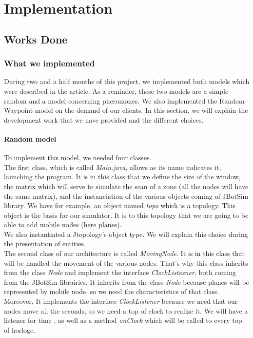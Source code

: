 \part{Implementation}

\setcounter{chapter}{0}

\chapter{Works Done}

\section{What we implemented}

During two and a half months of this project, we implemented both models which were described in the article. As a reminder, these two models are a simple random and a model concerning pheromones. We also implemented the Random Waypoint model on the demand of our clients. In this section, we will explain the development work that we have provided and the different choices.

\subsection{Random model} 

To implement this model, we needed four classes.\\
The first class, which is called \textit{Main.java}, allows as its name indicates it, launching the program. It is in this class that we define the size of the window, the matrix which will serve to simulate the scan of a zone (all the nodes will have the same matrix), and the instanciation of the various objects coming of JBotSim library. We have for example, an object named \textit{topo} which is a topology. This object is the basis for our simulator. It is to this topology that we are going to be able to add mobile nodes (here planes).\\

We also instantiated a Jtopology's object type. We will explain this choice during the presentation of entities.\\

The second class of our architecture is called \textit{MovingNode}. It is in this class that will be handled the movement of the various nodes. That's why this class inherits from the class \textit{Node} and implement the interface \textit{ClockListesner}, both coming from the JBotSim librairies. It inherits from the class \textit{Node} because planes will be represented by mobile node, so we need the characteristics of that class. Moreover, It implements the interface \textit{ClockListener} because we need that our nodes move all the seconds, so we need a top of clock to realize it. We will have a listener for time , as well as a method \textit{onClock} which will be called to every top of horloge.\\

